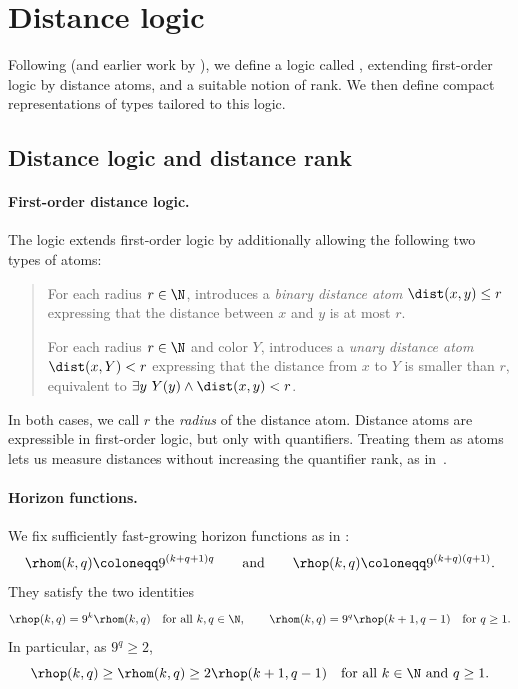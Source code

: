 \section{Distance logic}\label{sec:dist-rank}

Following \cite{mw-arxiv,mw-stoc} (and earlier work by \cite{gks}),
we define a logic called \distFO, extending first-order logic by distance atoms, and a suitable notion of rank. We then define compact representations of types tailored to this logic.

\subsection{Distance logic and distance rank}

\paragraph{First-order distance logic.}
The logic \distFO extends first-order logic by additionally allowing the following two types of atoms:
\begin{quote}
     For each radius \(r \in \N\), \distFO introduces
        a \emph{binary distance atom} \(\dist(x,y) \le r\) expressing that the distance between \(x\) and \(y\) is at most \(r\).

     For each radius \(r \in \N\) and color \(Y\), \distFO introduces
        a \emph{unary distance atom} \({\dist(x,Y) < r}\) expressing that the distance from \(x\) to \(Y\) is smaller than \(r\),
        equivalent to \({\exists y~Y(y) \land \dist(x,y) < r}\).
\end{quote}
In both cases, we call \(r\) the \emph{radius} of the distance atom.
Distance atoms are expressible in first-order logic, but only with quantifiers.
Treating them as atoms lets us measure distances without increasing the quantifier rank, as in~\cite{gks}.

\paragraph{Horizon functions.}
We fix sufficiently fast-growing horizon functions as in \cite{locality-note}:
\begin{equation}\label{eq:horizon-def}
\rhom(k,q)\coloneqq 9^{(k+q+1)q}
\qquad\text{and}\qquad
\rhop(k,q)\coloneqq 9^{(k+q)(q+1)}.
\end{equation}
They satisfy the two identities
\begin{equation}\label{eq:horizon}
\rhop(k,q)=9^k\rhom(k,q)\quad\text{for all $k,q\in\N$},
\qquad
\rhom(k,q)=9^q\rhop(k+1,q-1)\quad\text{for $q\ge1$}.
\end{equation}
In particular, as $9^q\ge2$,
\begin{equation}\label{eq:horizon-cons}
\rhop(k,q)\ge\rhom(k,q)\ge2\rhop(k+1,q-1)\quad\text{for all $k\in\N$ and $q\ge1$}.
\end{equation}

